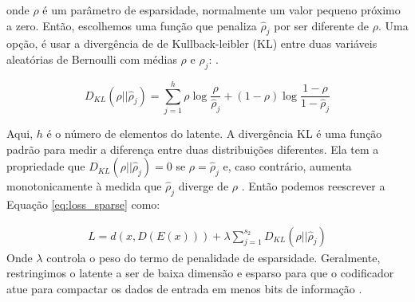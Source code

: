 onde ${\rho}$ é um parâmetro de esparsidade, normalmente um valor pequeno próximo a zero. 
Então, escolhemos uma função que penaliza $\hat{\rho}_{j}$ por ser diferente de ${\rho}$. Uma opção, é usar a divergência de 
de Kullback-leibler (KL) \cite{kullback1951information} entre duas variáveis aleatórias de Bernoulli com médias ${\rho}$ e $\hat{\rho}_{j}$: \cite{ng2011sparse}.  

\begin{equation}
D_{KL}(\rho||\hat{\rho}_{j}) = \sum_{j=1}^{h}\rho \log \frac{\rho}{\hat{\rho}_{j}} +(1-\rho)\log \frac{1- \rho}{1-\hat{\rho}_j}
\end{equation}

Aqui, $h$ é o número de elementos do latente.  A divergência KL é uma função padrão para medir a diferença entre duas distribuições diferentes. Ela tem a propriedade que $D_{KL}(\rho||\hat{\rho}_{j}) = 0$ se $\rho = \hat{\rho}_{j}$ e, caso contrário, aumenta monotonicamente à medida que $\hat{\rho}_{j}$ diverge de $\rho$ \cite{kullback1951information}. Então podemos reescrever a Equação \ref{eq:loss_sparse} como:

\begin{equation}
\label{eq:loss_sparse2}
\begin{aligned}
L = d({x},D(E({x}))) + \lambda \sum_{j=1}^{s_2} D_{KL}(\rho||\hat{\rho}_{j}) 
\end{aligned}
\end{equation}
Onde $\lambda$ controla o peso do termo de penalidade de esparsidade. Geralmente, restringimos o latente a ser de baixa dimensão e esparso para que o codificador atue para compactar os dados de entrada em menos bits de informação \cite{FrancoisDeepLearning}.





